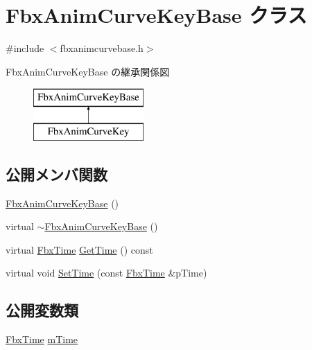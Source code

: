 \hypertarget{class_fbx_anim_curve_key_base}{}\section{Fbx\+Anim\+Curve\+Key\+Base クラス}
\label{class_fbx_anim_curve_key_base}


{\ttfamily \#include $<$fbxanimcurvebase.\+h$>$}

Fbx\+Anim\+Curve\+Key\+Base の継承関係図\begin{figure}[H]
\begin{center}
\leavevmode
\includegraphics[height=2.000000cm]{class_fbx_anim_curve_key_base}
\end{center}
\end{figure}
\subsection*{公開メンバ関数}
\begin{DoxyCompactItemize}
\item 
\hyperlink{class_fbx_anim_curve_key_base_a76d982fc9fe4888f2db2e8d4bb5d4f2f}{Fbx\+Anim\+Curve\+Key\+Base} ()
\item 
virtual \hyperlink{class_fbx_anim_curve_key_base_a2f773ce4bba07ee0f92f9cb9b5f3233b}{$\sim$\+Fbx\+Anim\+Curve\+Key\+Base} ()
\item 
virtual \hyperlink{class_fbx_time}{Fbx\+Time} \hyperlink{class_fbx_anim_curve_key_base_a3eebfd7bd2101f759269373a6c9343a2}{Get\+Time} () const
\item 
virtual void \hyperlink{class_fbx_anim_curve_key_base_a1c8d15159d7b00280411c08f86c951ca}{Set\+Time} (const \hyperlink{class_fbx_time}{Fbx\+Time} \&p\+Time)
\end{DoxyCompactItemize}
\subsection*{公開変数類}
\begin{DoxyCompactItemize}
\item 
\hyperlink{class_fbx_time}{Fbx\+Time} \hyperlink{class_fbx_anim_curve_key_base_a8b62f6694176ae418ed4cb936f52545a}{m\+Time}
\end{DoxyCompactItemize}


